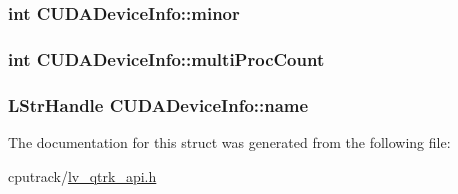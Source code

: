 \subsubsection[{\texorpdfstring{minor}{minor}}]{\setlength{\rightskip}{0pt plus 5cm}int C\+U\+D\+A\+Device\+Info\+::minor}\hypertarget{struct_c_u_d_a_device_info_aece001b941ba540febcdd704bd6b6e86}{}\label{struct_c_u_d_a_device_info_aece001b941ba540febcdd704bd6b6e86}
\subsubsection[{\texorpdfstring{multi\+Proc\+Count}{multiProcCount}}]{\setlength{\rightskip}{0pt plus 5cm}int C\+U\+D\+A\+Device\+Info\+::multi\+Proc\+Count}\hypertarget{struct_c_u_d_a_device_info_aa49e12b08b205bd073e1d0fbf9f06815}{}\label{struct_c_u_d_a_device_info_aa49e12b08b205bd073e1d0fbf9f06815}
\subsubsection[{\texorpdfstring{name}{name}}]{\setlength{\rightskip}{0pt plus 5cm}L\+Str\+Handle C\+U\+D\+A\+Device\+Info\+::name}\hypertarget{struct_c_u_d_a_device_info_a58843d89b2ccb6dcb9c7c0c9337e030b}{}\label{struct_c_u_d_a_device_info_a58843d89b2ccb6dcb9c7c0c9337e030b}


The documentation for this struct was generated from the following file\+:\begin{DoxyCompactItemize}
\item 
cputrack/\hyperlink{lv__qtrk__api_8h}{lv\+\_\+qtrk\+\_\+api.\+h}\end{DoxyCompactItemize}
